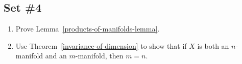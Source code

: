 \subsection{Set \#4}
\begin{enumerate}[label=4.\arabic*]
  \item \label{products-of-manifolds-exercise} Prove Lemma~\ref{products-of-manifolds-lemma}.
  \item \label{invariance-of-dimension-manifolds} Use Theorem~\ref{invariance-of-dimension} to show that if $X$ is both an $n$-manifold and an $m$-manifold, then $m = n$.
\end{enumerate}
